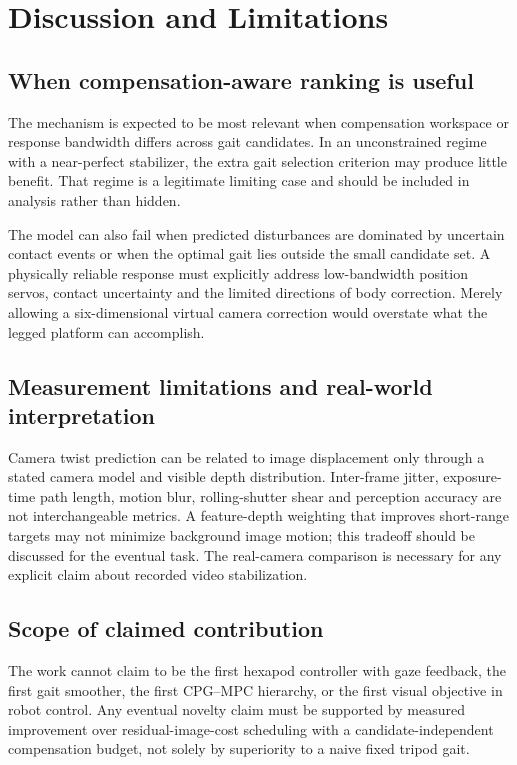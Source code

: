 \section{Discussion and Limitations}
\subsection{When compensation-aware ranking is useful}
The mechanism is expected to be most relevant when compensation workspace or response bandwidth differs across gait candidates. In an unconstrained regime with a near-perfect stabilizer, the extra gait selection criterion may produce little benefit. That regime is a legitimate limiting case and should be included in analysis rather than hidden.

The model can also fail when predicted disturbances are dominated by uncertain contact events or when the optimal gait lies outside the small candidate set. A physically reliable response must explicitly address low-bandwidth position servos, contact uncertainty and the limited directions of body correction. Merely allowing a six-dimensional virtual camera correction would overstate what the legged platform can accomplish.

\subsection{Measurement limitations and real-world interpretation}
Camera twist prediction can be related to image displacement only through a stated camera model and visible depth distribution. Inter-frame jitter, exposure-time path length, motion blur, rolling-shutter shear and perception accuracy are not interchangeable metrics. A feature-depth weighting that improves short-range targets may not minimize background image motion; this tradeoff should be discussed for the eventual task. The real-camera comparison is necessary for any explicit claim about recorded video stabilization.

\subsection{Scope of claimed contribution}
The work cannot claim to be the first hexapod controller with gaze feedback, the first gait smoother, the first CPG--MPC hierarchy, or the first visual objective in robot control. Any eventual novelty claim must be supported by measured improvement over residual-image-cost scheduling with a candidate-independent compensation budget, not solely by superiority to a naive fixed tripod gait.

